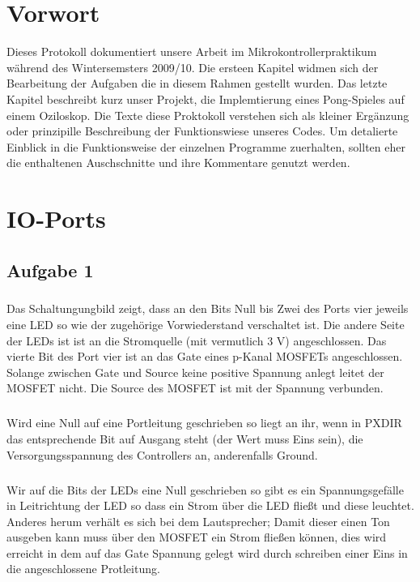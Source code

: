 \chapter{Vorwort}

Dieses Protokoll dokumentiert unsere Arbeit im Mikrokontrollerpraktikum während des Wintersemsters 2009/10. Die ersteen Kapitel widmen sich der Bearbeitung der Aufgaben die in diesem Rahmen gestellt wurden. Das letzte Kapitel beschreibt kurz unser Projekt, die Implemtierung eines Pong-Spieles auf einem Oziloskop. Die Texte diese Proktokoll verstehen sich als kleiner Ergänzung oder prinzipille Beschreibung der Funktionswiese unseres Codes. Um detalierte Einblick in die Funktionsweise der einzelnen Programme zuerhalten, sollten eher die enthaltenen Auschschnitte und ihre Kommentare genutzt werden.

\chapter{IO-Ports}

\section*{Aufgabe 1}

\paragraph*{}
Das Schaltungungbild zeigt, dass an den Bits Null bis Zwei des Ports vier 
jeweils eine LED so wie der zugehörige Vorwiederstand verschaltet ist. 
Die andere Seite der LEDs ist ist an die Stromquelle (mit vermutlich 3 V) 
angeschlossen. Das vierte Bit des Port vier ist an das Gate eines p-Kanal 
MOSFETs angeschlossen. Solange zwischen Gate und Source keine positive
Spannung anlegt leitet der MOSFET nicht. Die Source des MOSFET ist mit 
der Spannung verbunden.
\paragraph*{}
Wird eine Null auf eine Portleitung geschrieben so liegt an ihr, wenn in
PXDIR das entsprechende Bit auf Ausgang steht (der Wert muss Eins sein), 
die Versorgungsspannung des Controllers an, anderenfalls Ground.
\paragraph*{}
Wir auf die Bits der LEDs eine Null geschrieben so gibt es ein 
Spannungsgefälle in Leitrichtung der LED so dass ein Strom über die LED 
fließt und diese leuchtet. Anderes herum verhält es sich bei dem 
Lautsprecher; Damit dieser einen Ton ausgeben kann muss über den MOSFET
ein Strom fließen können, dies wird erreicht in dem auf das Gate Spannung 
gelegt wird durch schreiben einer Eins in die angeschlossene Protleitung.

